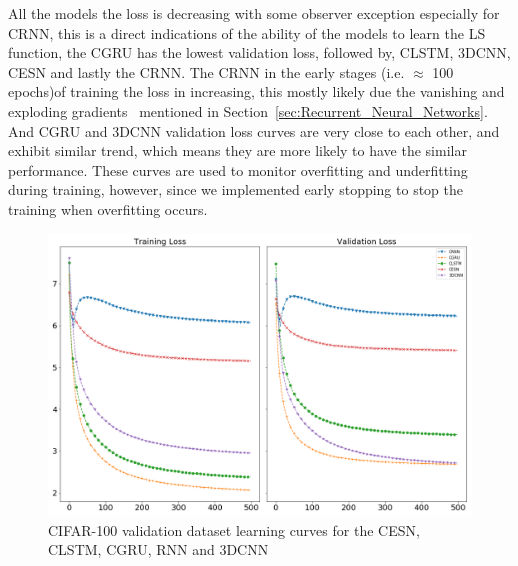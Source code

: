 \documentclass{WitsPhysicsReport}
\begin{document}
All the models the loss is decreasing with some observer exception especially for CRNN, this is a direct indications of the ability of the models to learn the LS function, the CGRU has the lowest validation loss, followed by, CLSTM, 3DCNN, CESN and lastly the CRNN. The CRNN in the early stages (i.e. $\approx$ 100 epochs)of training the loss in increasing, this mostly likely due the vanishing and exploding gradients~\cite{pascanu2013difficulty} mentioned in Section~\ref{sec:Recurrent_Neural_Networks}. And CGRU and 3DCNN validation loss curves are very close to each other, and exhibit similar trend, which means they are more likely to have the similar performance. These curves are used to monitor overfitting and underfitting during training, however, since we implemented early stopping to stop the training when overfitting occurs.


\begin{figure}[H]
\centering
  \includegraphics[width=1\textwidth]{Figure/Results/CIFAR_100_loss.png}
\caption{CIFAR-100 validation dataset learning curves for the CESN, CLSTM, CGRU, RNN and 3DCNN}
 \label{fig:cifar_100_model_loss}
\end{figure}
\end{document}
